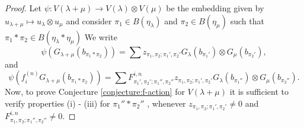 \documentclass[final]{amsart}
\theoremstyle{plain}
\theoremstyle{definition}
\begin{document}
\begin{proof}
    Let $\psi\colon V(\lambda + \mu) \to V(\lambda) \otimes V(\mu)$ be the embedding given by $u_{\lambda + \mu} \mapsto u_\lambda \otimes u_\mu$ and consider $\pi_1 \in B(\eta_\lambda)$ and $\pi_2 \in B(\eta_\mu)$ such that $\pi_1 * \pi_2 \in B(\eta_\lambda * \eta_\mu)$
    We write
    \[
        \psi(G_{\lambda+\mu}(b_{\pi_1*\pi_2})) = \sum z_{\pi_1,\pi_2;\pi_1',\pi_2'} G_\lambda(b_{\pi_1'}) \otimes G_\mu(b_{\pi_2'}),
    \]
    and
    \[
        \psi(f_i^{(n)} G_{\lambda+\mu}(b_{\pi_1*\pi_2})) = \sum F_{\pi_1',\pi_2';\pi_1'',\pi_2''}^{i,n} z_{\pi_1,\pi_2;\pi_1',\pi_2'} G_\lambda(b_{\pi_1''}) \otimes G_\mu(b_{\pi_2''}).
    \]
    Now, to prove Conjecture \ref{conjecture:f-action} for $V(\lambda + \mu)$ it is sufficient to verify properties (i) - (iii) for $\pi_1''*\pi_2''$ , whenever $z_{\pi_1,\pi_2;\pi_1',\pi_2'} \neq 0$ and $F_{\pi_1,\pi_2;\pi_1'',\pi_2''}^{i,n} \neq 0$.


\end{proof}
\end{document}
